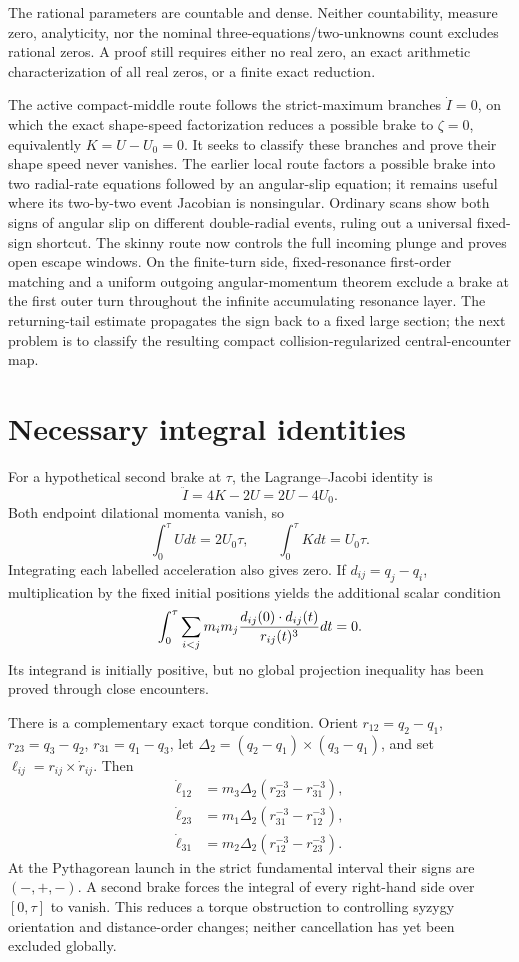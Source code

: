 \documentclass[11pt]{article}
\begin{document}
The rational parameters are countable and dense.  Neither countability,
measure zero, analyticity, nor the nominal three-equations/two-unknowns count
excludes rational zeros.  A proof still requires either no real zero, an exact
arithmetic characterization of all real zeros, or a finite exact reduction.

The active compact-middle route follows the strict-maximum branches
$\dot I=0$, on which the exact shape-speed factorization reduces a possible
brake to $\zeta=0$, equivalently $K=U-U_0=0$.  It seeks to classify these
branches and prove their shape speed never vanishes.  The earlier local route
factors a possible brake into two radial-rate equations followed by an
angular-slip equation; it remains useful where its two-by-two event Jacobian
is nonsingular.
Ordinary scans show both signs of angular slip on different double-radial
events, ruling out a universal fixed-sign shortcut. The skinny route now
controls the full incoming plunge and proves open escape windows. On the
finite-turn side, fixed-resonance first-order matching and a uniform outgoing
angular-momentum theorem exclude a brake at the first outer turn throughout
the infinite accumulating resonance layer. The returning-tail estimate
propagates the sign back to a fixed large section; the next problem is to
classify the resulting compact collision-regularized central-encounter map.

\section{Necessary integral identities}

For a hypothetical second brake at $\tau$, the Lagrange--Jacobi identity is
\[
\ddot I=4K-2U=2U-4U_0.
\]
Both endpoint dilational momenta vanish, so
\[
\int_0^\tau Udt=2U_0\tau,\qquad
\int_0^\tau Kdt=U_0\tau.
\]
Integrating each labelled acceleration also gives zero.  If
$d_{ij}=q_j-q_i$, multiplication by the fixed initial positions yields the
additional scalar condition
\[
\int_0^\tau\sum_{i<j}m_im_j
{d_{ij}(0)\cdot d_{ij}(t)\over r_{ij}(t)^3}dt=0.
\]
Its integrand is initially positive, but no global projection inequality has
been proved through close encounters.

There is a complementary exact torque condition. Orient
$r_{12}=q_2-q_1$, $r_{23}=q_3-q_2$, $r_{31}=q_1-q_3$, let
$\Delta_2=(q_2-q_1)\times(q_3-q_1)$, and set
$\ell_{ij}=r_{ij}\times\dot r_{ij}$. Then
\[
\begin{aligned}
 \dot\ell_{12}&=m_3\Delta_2(r_{23}^{-3}-r_{31}^{-3}),\\
 \dot\ell_{23}&=m_1\Delta_2(r_{31}^{-3}-r_{12}^{-3}),\\
 \dot\ell_{31}&=m_2\Delta_2(r_{12}^{-3}-r_{23}^{-3}).
\end{aligned}
\]
At the Pythagorean launch in the strict fundamental interval their signs are
$(-,+,-)$. A second brake forces the integral of every right-hand side over
$[0,\tau]$ to vanish. This reduces a torque obstruction to controlling
syzygy orientation and distance-order changes; neither cancellation has yet
been excluded globally.
\end{document}
